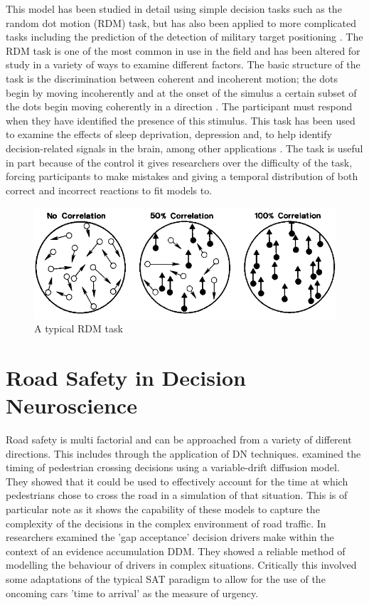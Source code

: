 This model has been studied in detail using simple decision tasks such as the random dot motion (RDM) task, but has also been applied to more complicated tasks including the prediction of the detection of military target positioning \citep{heitzNeuralMechanismsSpeedAccuracy2012}. The RDM task is one of the most common in use in the field and has been altered for study in a variety of ways to examine different factors. The basic structure of the task is the discrimination between coherent and incoherent motion; the dots begin by moving incoherently and at the onset of the simulus a certain subset of the dots begin moving coherently in a direction \citep{brittenAnalysisVisualMotion1992}. The participant must respond when they have identified the presence of this stimulus. This task has been used to examine the effects of sleep deprivation, depression and, to help identify decision-related signals in the brain, among other applications \citep{ratcliffDiffusionModelOnechoice2011, kellyInternalExternalInfluences2013, whiteUsingDiffusionModels2010}. The task is useful in part because of the control it gives researchers over the difficulty of the task, forcing participants to make mistakes and giving a temporal distribution of both correct and incorrect reactions to fit models to.
\begin{figure}[H]
    \centering
    \includegraphics[width=0.75\linewidth]{figures/dots.PNG}
    \caption{A typical RDM task \citep{brittenAnalysisVisualMotion1992}}
    \label{fig:RDM}
\end{figure}

\section{Road Safety in Decision Neuroscience}
Road safety is multi factorial and can be approached from a variety of different directions. This includes through the application of DN techniques. \citet{pekkanenVariableDriftDiffusionModels2022} examined the timing of pedestrian crossing decisions using a variable-drift diffusion model. They showed that it could be used to effectively account for the time at which pedestrians chose to cross the road in a simulation of that situation. This is of particular note as it shows the capability of these models to capture the complexity of the decisions in the complex environment of road traffic. In \citet{zgonnikovShouldStayShould2024} researchers examined the 'gap acceptance' decision drivers make within the context of an evidence accumulation DDM. They showed a reliable method of modelling the behaviour of drivers in complex situations. Critically this involved some adaptations of the typical SAT paradigm to allow for the use of the oncoming cars 'time to arrival' as the measure of urgency.

